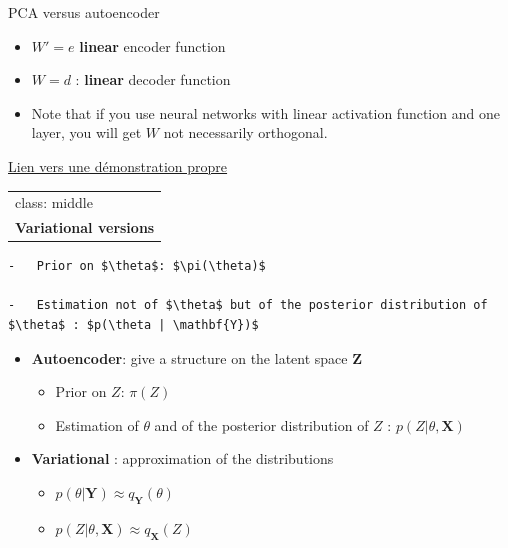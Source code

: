 \documentclass[
  ignorenonframetext,
]{beamer}
\begin{document}
\begin{frame}[fragile]{PCA versus autoencoder}
\protect\hypertarget{pca-versus-autoencoder-1}{}
\begin{itemize}
\item
  \(W' = e\) \textbf{linear} encoder function
\item
  \(W = d\) : \textbf{linear} decoder function
\item
  Note that if you use neural networks with linear activation function
  and one layer, you will get \(W\) not necessarily orthogonal.
\end{itemize}

\href{http://www.xavierdupre.fr/app/mlstatpy/helpsphinx/c_ml/rn/rn_9_auto.html}{Lien
vers une démonstration propre}

\begin{longtable}[]{@{}
  >{\raggedright\arraybackslash}p{}@{}}
\toprule
\endhead
class: middle \\
\textbf{Variational versions} \\
\bottomrule
\end{longtable}

\begin{verbatim}
-   Prior on $\theta$: $\pi(\theta)$

-   Estimation not of $\theta$ but of the posterior distribution of $\theta$ : $p(\theta | \mathbf{Y})$
\end{verbatim}

\begin{itemize}
\item
  \textbf{Autoencoder}: give a structure on the latent space
  \(\mathbf{Z}\)

  \begin{itemize}
  \item
    Prior on \(Z\): \(\pi(Z)\)
  \item
    Estimation of \(\theta\) and of the posterior distribution of \(Z\)
    : \(p(Z | \theta, \mathbf{X})\)
  \end{itemize}
\item
  \textbf{Variational} : approximation of the distributions

  \begin{itemize}
  \item
    \(p(\theta | \mathbf{Y}) \approx q_\mathbf{Y}(\theta)\)
  \item
    \(p(Z | \theta, \mathbf{X}) \approx q_\mathbf{X}(Z)\)
  \end{itemize}
\end{itemize}
\end{frame}
\end{document}
